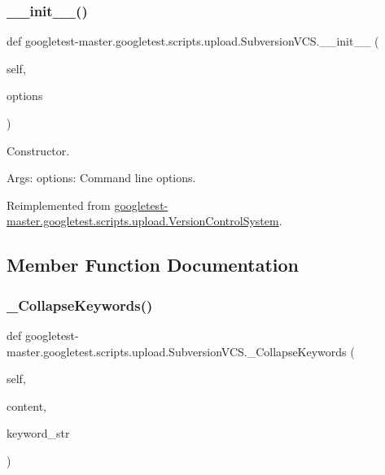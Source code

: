 \subsubsection{\texorpdfstring{\_\_init\_\_()}{\_\_init\_\_()}}
{\footnotesize\ttfamily def googletest-\/master.\+googletest.\+scripts.\+upload.\+Subversion\+V\+C\+S.\+\_\+\+\_\+init\+\_\+\+\_\+ (\begin{DoxyParamCaption}\item[{}]{self,  }\item[{}]{options }\end{DoxyParamCaption})}

\begin{DoxyVerb}Constructor.

Args:
  options: Command line options.
\end{DoxyVerb}
 

Reimplemented from \mbox{\hyperlink{classgoogletest-master_1_1googletest_1_1scripts_1_1upload_1_1_version_control_system_a28c02d45c4bd32f9750090e1eda733a3}{googletest-\/master.\+googletest.\+scripts.\+upload.\+Version\+Control\+System}}.



\subsection{Member Function Documentation}
\mbox{\label{classgoogletest-master_1_1googletest_1_1scripts_1_1upload_1_1_subversion_v_c_s_a310ff25edd58a6964f9ac3a498ef5d0b}} 
\subsubsection{\texorpdfstring{\_CollapseKeywords()}{\_CollapseKeywords()}}
{\footnotesize\ttfamily def googletest-\/master.\+googletest.\+scripts.\+upload.\+Subversion\+V\+C\+S.\+\_\+\+Collapse\+Keywords (\begin{DoxyParamCaption}\item[{}]{self,  }\item[{}]{content,  }\item[{}]{keyword\+\_\+str }\end{DoxyParamCaption})\hspace{0.3cm}{\ttfamily [private]}}

